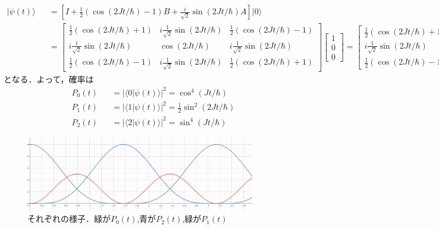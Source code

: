 \documentclass[12pt,dvipdfmx]{jsarticle}
\begin{document}
\begin{eqnarray}
  |\psi(t)\rangle &&= \left[  I + \frac{1}{2}\left( \cos(2J t/\hbar)-1 \right)B + \frac{i}{\sqrt{2}}\sin(2J t/\hbar)A \right]|0\rangle\\
  &&=
  \begin{bmatrix}
    \frac{1}{2}(\cos(2Jt/\hbar)+1) & i\frac{1}{\sqrt{2}} \sin(2Jt/\hbar) & \frac{1}{2}(\cos(2Jt/\hbar)-1)\\
    i \frac{1}{\sqrt{2}}\sin(2Jt/\hbar) & \cos(2Jt/\hbar) & i \frac{1}{\sqrt{2}}\sin(2Jt/\hbar)\\
    \frac{1}{2}(\cos(2Jt/\hbar)-1) & i \frac{1}{\sqrt{2}}\sin(2Jt/\hbar) & \frac{1}{2}(\cos(2Jt/\hbar)+1)
  \end{bmatrix}
  \begin{bmatrix}
    1\\
    0\\
    0
  \end{bmatrix}
  =
  \begin{bmatrix}
    \frac{1}{2}(\cos(2Jt/\hbar)+1) \\
    i \frac{1}{\sqrt{2}}\sin(2Jt/\hbar)\\
    \frac{1}{2}(\cos(2Jt/\hbar)-1) 
  \end{bmatrix}
\end{eqnarray}
となる．よって，確率は
\begin{eqnarray}
  P_0(t) &&= |\langle 0|\psi(t)\rangle|^2 = \cos^4(Jt/\hbar)\\
  P_1(t) &&= |\langle 1|\psi(t)\rangle|^2 =\frac{1}{2} \sin^2(2Jt/\hbar)\\
  P_2(t) &&= |\langle 2|\psi(t)\rangle|^2 = \sin^4(Jt/\hbar)
\end{eqnarray}

\begin{figure}[H]
  \begin{center}
  \includegraphics[width=100mm]{image.png}
  \caption{それぞれの様子．緑が$P_0(t)$,青が$P_2(t)$,緑が$P_1(t)$}
  \end{center}
\end{figure}
\end{document}
